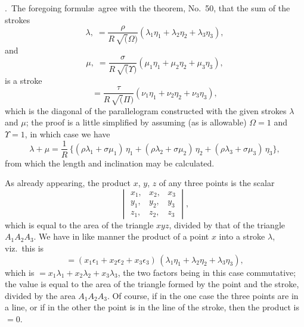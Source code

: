 \documentclass[11pt,a4paper]{book}
\begin{document}
.\ The foregoing formul\ae\ agree with the theorem, No.~50, that the sum of the strokes
\[
\lambda, \;= \frac{\rho}{R\, \surd(\Omega)}
(\lambda_1 \eta_1 + \lambda_2 \eta_2 + \lambda_3 \eta_3),
\]
and
\[
\mu, \;= \frac{\sigma}{R\, \surd(\Upsilon)}
(\mu_1 \eta_1 + \mu_2 \eta_2 + \mu_3 \eta_3),
\]
is a stroke
\[
= \frac{\tau}{R\, \surd(\Pi)}
(\nu_1 \eta_1 + \nu_2 \eta_2 + \nu_3 \eta_3),
\]
which is the diagonal of the parallelogram constructed with the given strokes $\lambda$ and $\mu$;
the proof is a little simplified by assuming (as is allowable) $\Omega = 1$ and $\Upsilon = 1$,
in which case we have
\[
\lambda + \mu = \frac{1}{R}\,
\{(\rho \lambda_1 + \sigma \mu_1)\, \eta_1
+ (\rho \lambda_2 + \sigma \mu_2)\, \eta_2
+ (\rho \lambda_3 + \sigma \mu_3)\, \eta_3\},
\]
from which the length and inclination may be calculated.

As already appearing, the product $x$, $y$, $z$ of any three points is the scalar
\[
\begin{vmatrix}
x_1, & x_2, & x_3 \\
y_1, & y_2, & y_3 \\
z_1, & z_2, & z_3
\end{vmatrix},
\]
which is equal to the area of the triangle $xyz$, divided by that of the triangle $A_1 A_2 A_3$.
We have in like manner the product of a point $x$ into a stroke $\lambda$, viz.\ this is
\[
= (x_1 \epsilon_1 + x_2 \epsilon_2 + x_3 \epsilon_3)\,
(\lambda_1 \eta_1 + \lambda_2 \eta_2 + \lambda_3 \eta_3),
\]
which is $= x_1 \lambda_1 + x_2 \lambda_2 + x_3 \lambda_3$, the two factors being in this case commutative;
the value is equal to the area of the triangle formed by the point and the stroke, divided by
the area $A_1 A_2 A_3$. Of course, if in the one case the three points are in a line, or if in
the other the point is in the line of the stroke, then the product is $= 0$.
\end{document}
